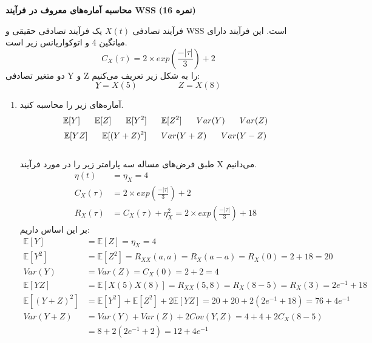 \Large \textbf{محاسبه آماره‌های معروف در فرآیند WSS}
\large \textbf{(16 نمره)}

\normalsize \vspace{0.5cm}
فرآیند تصادفی
$ X(t) $
یک فرآیند تصادفی حقیقی و WSS است. این فرآیند دارای میانگین 4 و اتوکواریانس زیر است.
$$
C_X(\tau) = 2 \times exp(\frac{-|\tau|}{3}) + 2
$$
دو متغیر تصادفی Y و Z را به شکل زیر تعریف می‌کنیم:
$$
ِY = X(5)  \hspace{2cm} Z = X(8)
$$
\begin{enumerate}[label=(\alph*)]
	\item
	آماره‌های زیر را محاسبه کنید.
	$$
	\mathbb{E}[Y] 
	\hspace{0.6cm} 
	\mathbb{E}[Z] 
	\hspace{0.6cm}
	\mathbb{E}[Y^2] 
	\hspace{0.6cm} 
	\mathbb{E}[Z^2] 
	\hspace{0.6cm}
	Var(Y)
	\hspace{0.6cm} 
	Var(Z)
	$$
	$$
	\mathbb{E}[YZ] 
	\hspace{0.6cm} 
	\mathbb{E}[(Y+Z)^2] 
	\hspace{0.6cm}
	Var(Y + Z)
	\hspace{0.6cm}
	Var(Y - Z)
	$$
	\\
	طبق فرض‌های مساله سه پارامتر زیر را در مورد فرآیند X می‌دانیم.
	\\
	\begin{align*}
		\eta(t) &= \eta_X = 4\\
		C_X(\tau) &=  2 \times exp(\frac{-|\tau|}{3}) + 2\\
		R_X(\tau) &= C_X(\tau) + \eta_X^2 = 2 \times exp(\frac{-|\tau|}{3}) + 18
	\end{align*}
بر این اساس داریم:
	\begin{align*}
		\mathbb{E}[Y] &= \mathbb{E}[Z] = \eta_X = 4 \\
		\mathbb{E}[Y^2] &= \mathbb{E}[Z^2] = R_{XX}(a, a) = R_X(a - a) = R_X(0) = 2 + 18 = 20 \\
		Var(Y) &= Var(Z) = C_X(0) = 2+2 = 4\\
		\mathbb{E}[YZ] &= \mathbb{E}[X(5)X(8)] = R_{XX}(5, 8) = R_X(8-5) = R_X(3) = 2e^{-1} + 18\\
		\mathbb{E}[(Y+Z)^2] &= \mathbb{E}[Y^2] + \mathbb{E}[Z^2] + 2 \mathbb{E}[YZ] = 20 + 20 + 2(2e^{-1} + 18) = 76 + 4e^{-1}\\
		Var(Y + Z) &= Var(Y) + Var(Z) + 2Cov(Y, Z) = 4 + 4 + 2 C_X(8-5) \\
		&=8 + 2(2e^{-1} + 2) = 12 + 4e^{-1} \\

\end{align*}
\end{enumerate}
